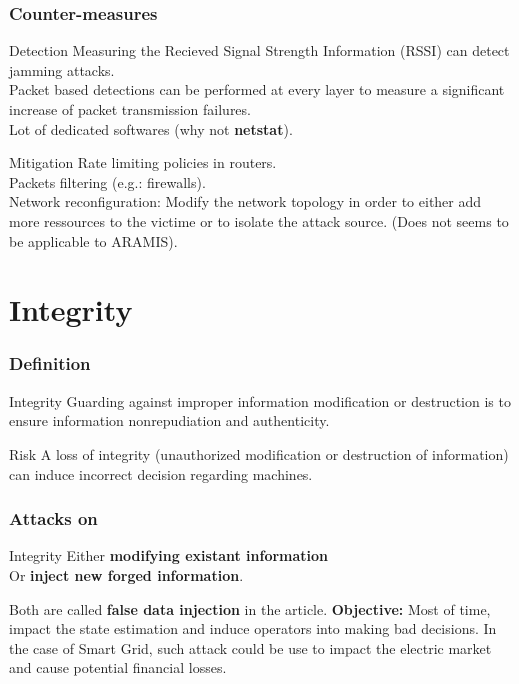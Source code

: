 \documentclass{beamer}
\begin{document}
\begin{frame}
    \frametitle{Counter-measures}

    \begin{block}{Detection}
        Measuring the Recieved Signal Strength Information (RSSI) can detect jamming attacks.\\
        Packet based detections can be performed at every layer to measure a significant increase of packet transmission failures.\\
        \medskip
        Lot of dedicated softwares (why not {\bf netstat}).
    \end{block}
    \vfill
    \begin{block}{Mitigation}
        Rate limiting policies in routers.\\
        Packets filtering (e.g.: firewalls).\\
        Network reconfiguration: Modify the network topology in order to either add more ressources to the victime or to isolate the attack source. (Does not seems to be applicable to ARAMIS).
    \end{block}
\end{frame}

\section{Integrity}

\begin{frame}
    \tableofcontents[currentsection]
\end{frame}

\begin{frame}
    \frametitle{Definition}

    \begin{block}{Integrity}
        Guarding against improper information modification or destruction is to ensure information nonrepudiation and authenticity.
    \end{block}
    \vfill
    \begin{block}{Risk}
        A loss of integrity (unauthorized modification or destruction of information) can induce incorrect decision regarding machines.
    \end{block}
\end{frame}

\begin{frame}
    \frametitle{Attacks on }

    \begin{block}{Integrity}
        Either {\bf modifying existant information}\\
        \medskip
        Or {\bf inject new forged information}.
    \end{block}
    \vfill
    Both are called {\bf false data injection} in the article.
    \vfill
    {\bf Objective:} Most of time, impact the state estimation and induce operators into making bad decisions.
    \vfill
    In the case of Smart Grid, such attack could be use to impact the electric market and cause potential financial losses.
\end{frame}
\end{document}
